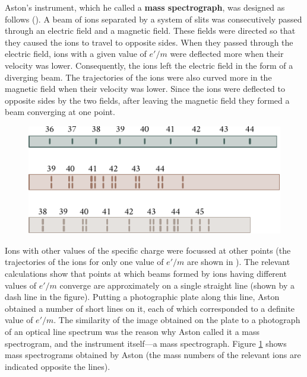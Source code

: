 Aston's instrument, which he called a \textbf{mass spectrograph}, was designed as follows ().
A beam of ions separated by a system of slits was consecutively passed through an electric field and a magnetic field.
These fields were directed so that they caused the ions to travel to opposite sides.
When they passed through the electric field, ions with a given value of $e'/m$ were deflected more when their velocity was lower.
Consequently, the ions left the electric field in the form of a diverging beam.
The trajectories of the ions were also curved more in the magnetic field when their velocity was lower.
Since the ions were deflected to opposite sides by the two fields, after leaving the magnetic field they formed a beam converging at one point.

\begin{figure}[t]
	\begin{center}
		\includegraphics[scale=0.93]{figures/ch_10/fig_10_12.pdf}
		\caption[]{}
		\label{fig:10_12}
	\end{center}
	\vspace{-0.9cm}
\end{figure}

Ions with other values of the specific charge were focussed at other points (the trajectories of the ions for only one value of $e'/m$ are shown in ).
The relevant calculations show that points at which beams formed by ions having different values of $e'/m$ converge are approximately on a single straight line (shown by a dash line in the figure).
Putting a photographic plate along this line, Aston obtained a number of short lines on it, each of which corresponded to a definite value of $e'/m$.
The similarity of the image obtained on the plate to a photograph of an optical line spectrum was the reason why Aston called it a mass spectrogram, and the instrument itself---a mass spectrograph.
Figure \ref{fig:10_12} shows mass spectrograms obtained by Aston (the mass numbers of the relevant ions are indicated opposite the lines).

